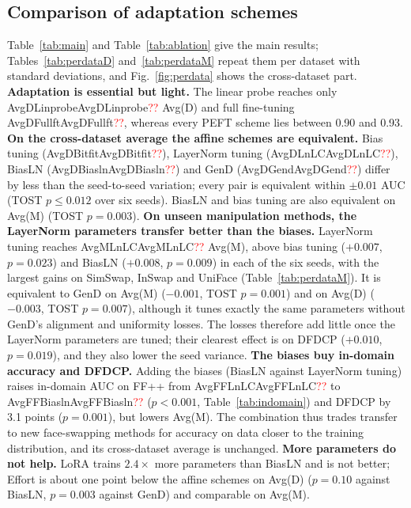 \documentclass[fonts]{icst}
\newcommand{\num}[1]{\ifcsname #1\endcsname\csname #1\endcsname\else\textcolor{red}{??}\fi}
\begin{document}
\subsection{Comparison of adaptation schemes}
Table~\ref{tab:main} and Table~\ref{tab:ablation} give the main results; Tables~\ref{tab:perdataD} and~\ref{tab:perdataM} repeat them per dataset with standard deviations, and Fig.~\ref{fig:perdata} shows the cross-dataset part.
\textbf{Adaptation is essential but light.} The linear probe reaches only \num{AvgDLinprobe} Avg(D) and full fine-tuning \num{AvgDFullft}, whereas every PEFT scheme lies between 0.90 and 0.93.
\textbf{On the cross-dataset average the affine schemes are equivalent.} Bias tuning (\num{AvgDBitfit}), LayerNorm tuning (\num{AvgDLnLC}), BiasLN (\num{AvgDBiasln}) and GenD (\num{AvgDGend}) differ by less than the seed-to-seed variation; every pair is equivalent within $\pm0.01$ AUC (TOST $p\le0.012$ over six seeds). BiasLN and bias tuning are also equivalent on Avg(M) (TOST $p=0.003$).
\textbf{On unseen manipulation methods, the LayerNorm parameters transfer better than the biases.} LayerNorm tuning reaches \num{AvgMLnLC} Avg(M), above bias tuning ($+0.007$, $p=0.023$) and BiasLN ($+0.008$, $p=0.009$) in each of the six seeds, with the largest gains on SimSwap, InSwap and UniFace (Table~\ref{tab:perdataM}). It is equivalent to GenD on Avg(M) ($-0.001$, TOST $p=0.001$) and on Avg(D) ($-0.003$, TOST $p=0.007$), although it tunes exactly the same parameters without GenD's alignment and uniformity losses. The losses therefore add little once the LayerNorm parameters are tuned; their clearest effect is on DFDCP ($+0.010$, $p=0.019$), and they also lower the seed variance.
\textbf{The biases buy in-domain accuracy and DFDCP.} Adding the biases (BiasLN against LayerNorm tuning) raises in-domain AUC on FF++ from \num{AvgFFLnLC} to \num{AvgFFBiasln} ($p<0.001$, Table~\ref{tab:indomain}) and DFDCP by 3.1 points ($p=0.001$), but lowers Avg(M). The combination thus trades transfer to new face-swapping methods for accuracy on data closer to the training distribution, and its cross-dataset average is unchanged.
\textbf{More parameters do not help.} LoRA trains $2.4\times$ more parameters than BiasLN and is not better; Effort is about one point below the affine schemes on Avg(D) ($p=0.10$ against BiasLN, $p=0.003$ against GenD) and comparable on Avg(M).

\begin{table}[!t]
\centering
\caption{Cross-dataset video AUC ($\times100$), mean $\pm$ std over $n$ seeds (same runs as Table~\ref{tab:main}). Bold: best; shaded: second best.}
\label{tab:perdataD}
\footnotesize

\vspace{3mm}
\caption{Cross-method video AUC ($\times100$) on the seven DF40 face-swapping sets, mean $\pm$ std over $n$ seeds. Bold: best; shaded: second best.}
\label{tab:perdataM}
\resizebox{\textwidth}{!}{}
\end{table}
\end{document}
